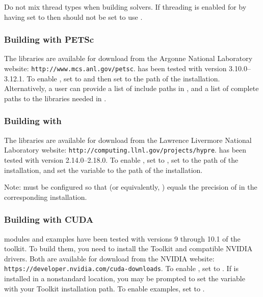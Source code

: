 \noindent Do not mix thread types when building {\sundials} solvers.  If
threading is enabled for {\sundials} by having  set to
 then {\superludist} should not be set to use {\openmp}.{\warn}

\subsubsection*{Building with PETSc}
\label{ss:building_with_petsc}
The {\petsc} libraries are available for download from the Argonne National
Laboratory website: {\tt http://www.mcs.anl.gov/petsc}. {\sundials} has been
tested with {\petsc} version 3.10.0--3.12.1. To enable {\petsc}, set
 to  and then set  to the path of the
{\petsc} installation. Alternatively, a user can provide a list of include paths
in , and a list of complete paths to the libraries needed in
.


\subsubsection*{Building with {\hypre}}
The {\hypre} libraries are available for download from the Lawrence Livermore
National Laboratory website: {\tt http://computing.llnl.gov/projects/hypre}.
{\sundials} has been tested with {\hypre} version 2.14.0--2.18.0.  To enable
{\hypre}, set   to , set  to
the  path of the {\hypre} installation, and set the variable
 to the  path of the {\hypre} installation.

Note: {\sundials} must be configured so that  (or
equivalently, ) equals the precision of
 in the corresponding {\hypre} installation.


\subsubsection*{Building with CUDA}
{\sundials} {\cuda} modules and examples have been tested with versions 9
through 10.1 of the {\cuda} toolkit. To build them, you need to install the
Toolkit and compatible NVIDIA drivers. Both are available for download from the
NVIDIA website: {\tt https://developer.nvidia.com/cuda-downloads}. To enable
{\cuda}, set  to . If {\cuda} is installed in a
nonstandard location, you may be prompted to set the variable
 with your {\cuda} Toolkit installation path. To
enable {\cuda} examples, set  to .

